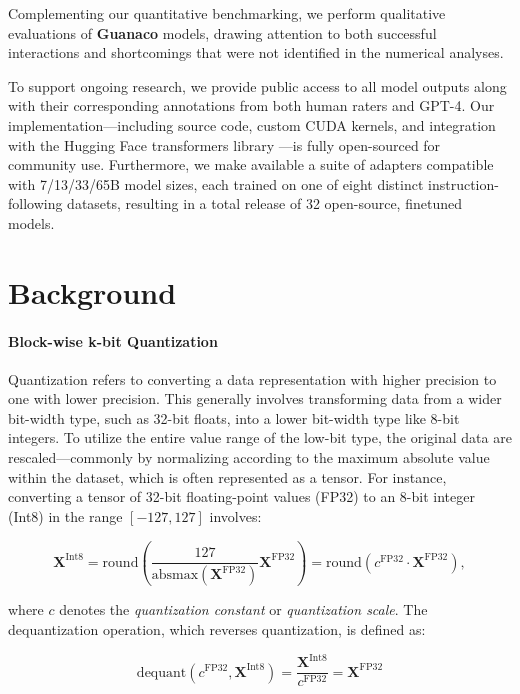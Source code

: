 Complementing our quantitative benchmarking, we perform qualitative evaluations of \textbf{Guanaco} models, drawing attention to both successful interactions and shortcomings that were not identified in the numerical analyses.

To support ongoing research, we provide public access to all model outputs along with their corresponding annotations from both human raters and GPT-4. Our implementation—including source code, custom CUDA kernels, and integration with the Hugging Face transformers library \citep{wolf2019huggingface}—is fully open-sourced for community use. Furthermore, we make available a suite of adapters compatible with 7/13/33/65B model sizes, each trained on one of eight distinct instruction-following datasets, resulting in a total release of 32 open-source, finetuned models.

\section{Background}
\paragraph{Block-wise k-bit Quantization} Quantization refers to converting a data representation with higher precision to one with lower precision. This generally involves transforming data from a wider bit-width type, such as 32-bit floats, into a lower bit-width type like 8-bit integers. To utilize the entire value range of the low-bit type, the original data are rescaled—commonly by normalizing according to the maximum absolute value within the dataset, which is often represented as a tensor. For instance, converting a tensor of 32-bit floating-point values (FP32) to an 8-bit integer (Int8) in the range $[-127, 127]$ involves:

\begin{equation}
    \mathbf{X}^{ \text{Int8}} = \text{round}\left( \frac{127}{{\text{absmax}}(\mathbf{X}^{{\text{FP32}}})}\mathbf{X}^{{\text{FP32}}} \right) = \text{round}(c^{\text{FP32}}\cdot \mathbf{X}^{{\text{FP32}}}),
\end{equation}

where $c$ denotes the {\em quantization constant} or {\em quantization scale}. The dequantization operation, which reverses quantization, is defined as:

\begin{equation}
    \text{dequant}(c^{\text{FP32}}, \mathbf{X}^{\text{Int8}}) = \frac{\mathbf{X}^{\text{Int8}}}{c^{\text{FP32}}} = \mathbf{X}^{\text{FP32}}
\end{equation}

